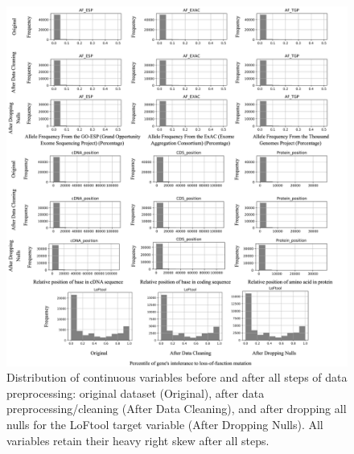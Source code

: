 \documentclass[journal,twoside,web]{ieeecolor}
\begin{document}
\clearpage
\begin{figure}[!t]
\centering
\includegraphics[width=\textwidth]{Supplementary Figure 2 .png}
\caption{Distribution of continuous variables before and after all steps of data preprocessing: original dataset (Original), after data preprocessing/cleaning (After Data Cleaning), and after dropping all nulls for the LoFtool target variable (After Dropping Nulls). All variables retain their heavy right skew after all steps.}
\label{fig2}
\end{figure}
\end{document}
